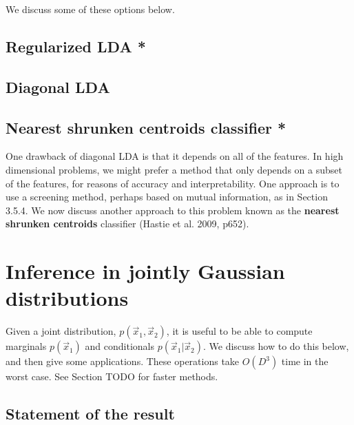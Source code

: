 We discuss some of these options below.


\subsection{Regularized LDA *}


\subsection{Diagonal LDA}


\subsection{Nearest shrunken centroids classifier *}
One drawback of diagonal LDA is that it depends on all of the features. In high dimensional problems, we might prefer a method that only depends on a subset of the features, for reasons of accuracy and interpretability. One approach is to use a screening method, perhaps based on mutual information, as in Section 3.5.4. We now discuss another approach to this problem known as the \textbf{nearest shrunken centroids} classifier (Hastie et al. 2009, p652).


\section{Inference in jointly Gaussian distributions}
\label{sec:Inference-in-jointly-Gaussian-distributions}
Given a joint distribution, $p(\vec{x}_1,\vec{x}_2)$, it is useful to be able to compute marginals $p(\vec{x}_1)$ and conditionals $p(\vec{x}_1|\vec{x}_2)$. We discuss how to do this below, and then give some applications. These operations take $O(D^3)$ time in the worst case. See Section TODO for faster methods.


\subsection{Statement of the result}

